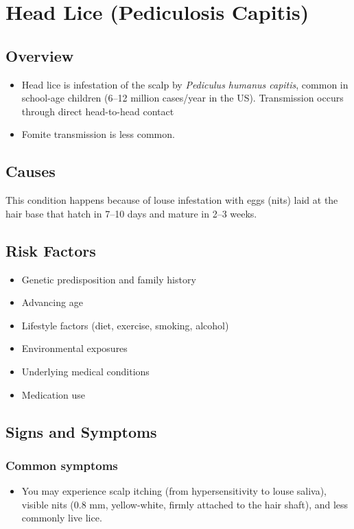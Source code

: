 \chapter{Head Lice (Pediculosis Capitis)}
\label{sec:Head Lice}

\section{Overview}


\begin{itemize}[noitemsep]
  \item Head lice is infestation of the scalp by \textit{Pediculus humanus capitis}, common in school-age children (6--12 million cases/year in the US). Transmission occurs through direct head-to-head contact
  \item Fomite transmission is less common.
\end{itemize}
\section{Causes}
This condition happens because of louse infestation with eggs (nits) laid at the hair base that hatch in 7--10 days and mature in 2--3 weeks.     
\section{Risk Factors}

\begin{itemize}[noitemsep]
  \item Genetic predisposition and family history
  \item Advancing age
  \item Lifestyle factors (diet, exercise, smoking, alcohol)
  \item Environmental exposures
  \item Underlying medical conditions
  \item Medication use
\end{itemize}
\section{Signs and Symptoms}

\subsection{Common symptoms}
\begin{itemize}[noitemsep]
  \item You may experience scalp itching (from hypersensitivity to louse saliva), visible nits (0.8 mm, yellow-white, firmly attached to the hair shaft), and less commonly live lice. 
  \end{itemize}

